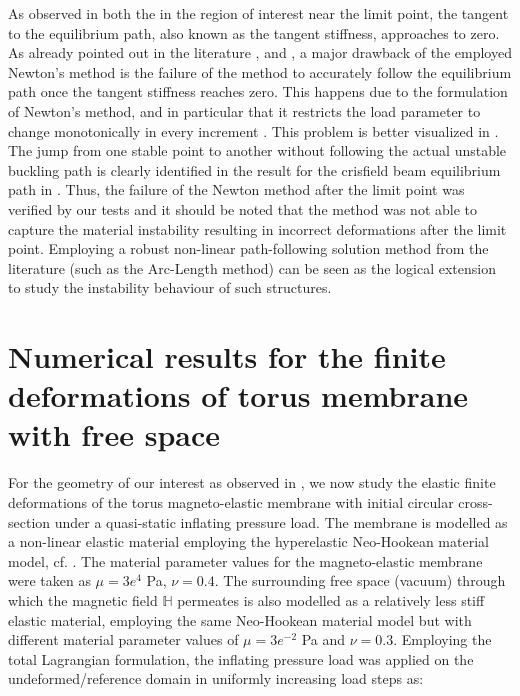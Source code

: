 As observed in both the  in the region of interest near the limit point, the tangent to the equilibrium path, also known as the tangent stiffness, approaches to zero. As already pointed out in the literature \cite{Riks1979}, \cite{CRISFIELD1981} and \cite{Vasios}, a major drawback of the employed Newton's method is the failure of the method to accurately follow the equilibrium path once the tangent stiffness reaches zero. This happens due to the formulation of Newton's method, and in particular that it restricts the load parameter to change monotonically in every increment \cite{Vasios}. This problem is better visualized in . The jump from one stable point to another without following the actual unstable buckling path is clearly identified in the result for the crisfield beam equilibrium path in . Thus, the failure of the Newton method after the limit point was verified by our tests and it should be noted that the method was not able to capture the material instability resulting in incorrect deformations after the limit point. Employing a robust non-linear path-following solution method from the literature \cite{CRISFIELD1981} (such as the Arc-Length method) can be seen as the logical extension to study the instability behaviour of such structures. \par 

\newpage
\section{Numerical results for the finite deformations of torus membrane with free space}
For the geometry of our interest as observed in , we now study the elastic finite deformations of the torus magneto-elastic membrane with initial circular cross-section under a quasi-static inflating pressure load. The membrane is modelled as a non-linear elastic material employing the hyperelastic Neo-Hookean material model, cf. . The material parameter values for the magneto-elastic membrane were taken as $\mu = 3e^4$ Pa, $\nu = 0.4$. The surrounding free space (vacuum) through which the magnetic field $\mathbb{H}$ permeates is also modelled as a relatively less stiff elastic material, employing the same Neo-Hookean material model but with different material parameter values of $\mu = 3e^{-2}$ Pa and $\nu = 0.3$. Employing the total Lagrangian formulation, the inflating pressure load was applied on the undeformed/reference domain in uniformly increasing load steps as:

